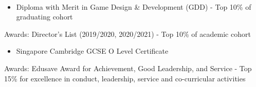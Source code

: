 \documentclass[a4paper,10pt]{article}
\begin{document}
  \begin{center}
    \begin{minipage}{1\textwidth}
      \normalsize\noindent{}\\[-0.25cm]
      \makebox[\linewidth]{\rule{1.02\linewidth}{0.3pt}}

      \noindent
      \hfill

      \vspace{0.15cm}

      \begin{itemize}[left=0pt, labelsep=0.5em, itemsep=0pt, topsep=0pt, parsep=0pt, partopsep=0pt]
        \item \small\lato Diploma with Merit in Game Design \& Development (GDD) - Top 10\% of graduating cohort            
      \end{itemize}
      \small\latobold Awards: \lato Director's List (2019/2020, 2020/2021) - Top 10\% of academic cohort 

      \vspace{0.25cm}

      \noindent
      \hfill

      \vspace{0.15cm}

      \begin{itemize}[left=0pt, labelsep=0.5em, itemsep=0pt, topsep=0pt, parsep=0pt, partopsep=0pt]
        \item \small\lato Singapore Cambridge GCSE O Level Certificate
      \end{itemize}
      \small\latobold Awards: \lato Edusave Award for Achievement, Good Leadership, and Service - Top 15\% for excellence in conduct, leadership, service and co-curricular activities\\

      \normalsize\noindent{}\\[-0.25cm]
      \makebox[\linewidth]{\rule{1.02\linewidth}{0.3pt}}

      \noindent
      \hfill
      \\
      \hfill


\end{minipage}
\end{center}
\end{document}
